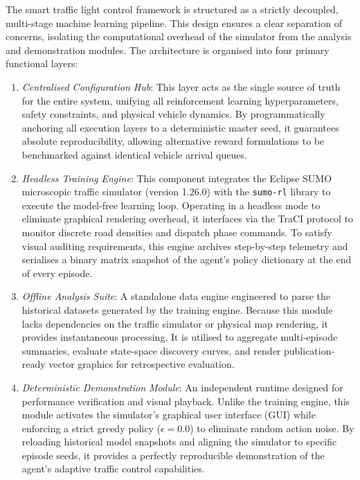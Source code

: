 \documentclass[12pt]{article}
\begin{document}
The smart traffic light control framework is structured as a strictly decoupled, multi-stage machine learning pipeline. This design ensures a clear separation of concerns, isolating the computational overhead of the simulator from the analysis and demonstration modules. The architecture is organised into four primary functional layers:
\begin{enumerate}
	\item \emph{Centralised Configuration Hub}: This layer acts as the single source of truth for the entire system, unifying all reinforcement learning hyperparameters, safety constraints, and physical vehicle dynamics. By programmatically anchoring all execution layers to a deterministic master seed, it guarantees absolute reproducibility, allowing alternative reward formulations to be benchmarked against identical vehicle arrival queues.
	
	\item \emph{Headless Training Engine}: This component integrates the Eclipse SUMO microscopic traffic simulator (version 1.26.0) with the \texttt{sumo-rl} library to execute the model-free learning loop. Operating in a headless mode to eliminate graphical rendering overhead, it interfaces via the TraCI protocol to monitor discrete road densities and dispatch phase commands. To satisfy visual auditing requirements, this engine archives step-by-step telemetry and serialises a binary matrix snapshot of the agent's policy dictionary at the end of every episode.
	
	\item \emph{Offline Analysis Suite}: A standalone data engine engineered to parse the historical datasets generated by the training engine. Because this module lacks dependencies on the traffic simulator or physical map rendering, it provides instantaneous processing. It is utilised to aggregate multi-episode summaries, evaluate state-space discovery curves, and render publication-ready vector graphics for retrospective evaluation.
	
	\item \emph{Deterministic Demonstration Module}: An independent runtime designed for performance verification and visual playback. Unlike the training engine, this module activates the simulator's graphical user interface (GUI) while enforcing a strict greedy policy (\( \epsilon = 0.0 \)) to eliminate random action noise. By reloading historical model snapshots and aligning the simulator to specific episode seeds, it provides a perfectly reproducible demonstration of the agent's adaptive traffic control capabilities.
\end{enumerate}
\end{document}

